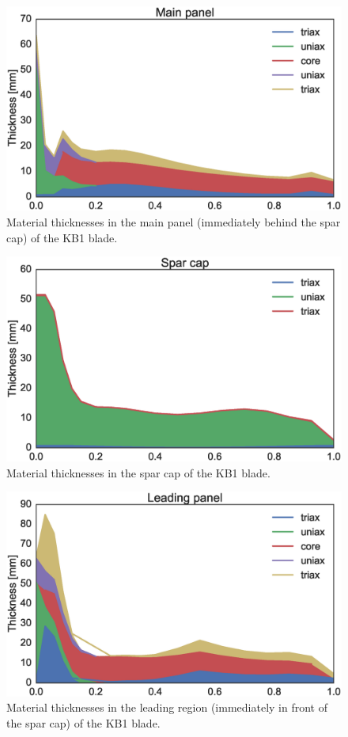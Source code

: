 \begin{figure}[!ht]
\begin{center}
	\includegraphics[width=.85\linewidth]{figures/KB1_region02.eps}
\end{center}
\caption{Material thicknesses in the main panel (immediately behind the spar cap) of the KB1 blade.}
\label{fig:KB1matstackr02}
\end{figure}

\begin{figure}[!ht]
\begin{center}
	\includegraphics[width=.85\linewidth]{figures/KB1_region04.eps}
\end{center}
\caption{Material thicknesses in the spar cap of the KB1 blade.}
\label{fig:KB1matstackr04}
\end{figure}

\begin{figure}[!ht]
\begin{center}
	\includegraphics[width=.85\linewidth]{figures/KB1_region06.eps}
\end{center}
\caption{Material thicknesses in the leading region (immediately in front of the spar cap) of the KB1 blade.}
\label{fig:KB1matstackr06}
\end{figure}

